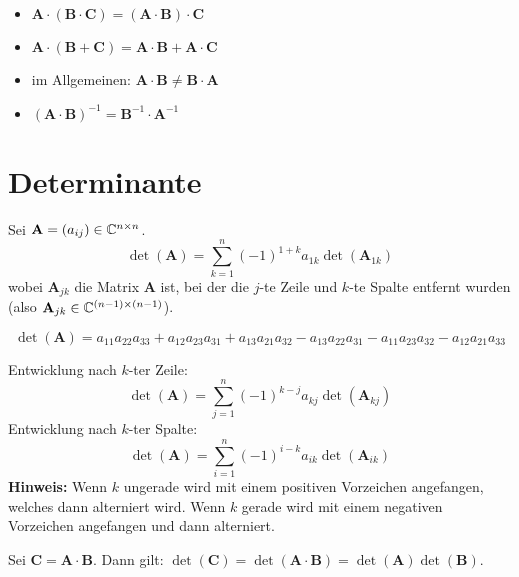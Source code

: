 \begin{itemize}
	\item $\mathbf{A} \cdot (\mathbf{B} \cdot \mathbf{C}) = (\mathbf{A} \cdot \mathbf{B}) \cdot \mathbf{C}$
	
	\item $\mathbf{A} \cdot (\mathbf{B} + \mathbf{C}) = \mathbf{A} \cdot \mathbf{B} + \mathbf{A} \cdot \mathbf{C}$
	
	\item im Allgemeinen: $\mathbf{A} \cdot \mathbf{B} \neq \mathbf{B} \cdot \mathbf{A}$
	
	\item $(\mathbf{A} \cdot \mathbf{B})^{-1} = \mathbf{B}^{-1} \cdot \mathbf{A}^{-1}$
	
\end{itemize}

\section{Determinante}

\begin{frameddefn}
	Sei $\mathbf{A} = (a_{ij}) \in \mathbb{C}^{n\times n}$.
	\[
	\det(\mathbf{A}) = \sum_{k=1}^{n} (-1)^{1+k} a_{1k} \det(\mathbf{A}_{1k})
	\]
	wobei $\mathbf{A}_{jk}$ die Matrix $\mathbf{A}$ ist, bei der die $j$-te Zeile und $k$-te Spalte entfernt wurden (also $\mathbf{A}_{jk} \in \mathbb{C}^{(n-1) \times (n-1)}$).
\end{frameddefn}

\begin{framedthm}
	\[
	\det(\mathbf{A}) = a_{11} a_{22} a_{33} + a_{12} a_{23} a_{31} + a_{13} a_{21} a_{32} - a_{13} a_{22} a_{31} - a_{11} a_{23} a_{32} - a_{12} a_{21} a_{33}
	\]
\end{framedthm}


\begin{framedthm}
	Entwicklung nach $k$-ter Zeile:
	\[
	\det(\mathbf{A}) = \sum_{j=1}^{n} (-1)^{k-j} a_{kj} \det(\mathbf{A}_{kj})
	\]
	Entwicklung nach $k$-ter Spalte:
	\[
	\det(\mathbf{A}) = \sum_{i=1}^{n} (-1)^{i-k} a_{ik} \det(\mathbf{A}_{ik})
	\]
	\textbf{Hinweis:} Wenn $k$ ungerade wird mit einem positiven Vorzeichen angefangen, welches dann alterniert wird. Wenn $k$ gerade wird mit einem negativen Vorzeichen angefangen und dann alterniert.
\end{framedthm}

\begin{framedthm}[Multiplikationstheorem]
	Sei $\mathbf{C} = \mathbf{A} \cdot \mathbf{B}$. Dann gilt: $\det(\mathbf{C})= \det(\mathbf{A}\cdot\mathbf{B}) = \det(\mathbf{A}) \det(\mathbf{B})$.
\end{framedthm}

